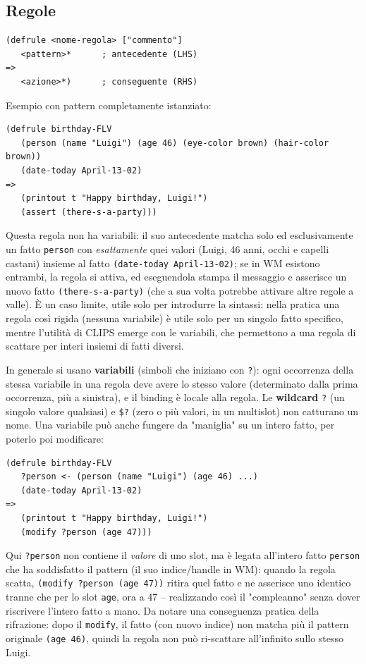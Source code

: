 \documentclass[a4paper,11pt]{article}
\begin{document}
\subsection{Regole}

\begin{lstlisting}
(defrule <nome-regola> ["commento"]
   <pattern>*      ; antecedente (LHS)
=>
   <azione>*)      ; conseguente (RHS)
\end{lstlisting}
Esempio con pattern completamente istanziato:
\begin{lstlisting}
(defrule birthday-FLV
   (person (name "Luigi") (age 46) (eye-color brown) (hair-color brown))
   (date-today April-13-02)
=>
   (printout t "Happy birthday, Luigi!")
   (assert (there-s-a-party)))
\end{lstlisting}
Questa regola non ha variabili: il suo antecedente matcha solo ed esclusivamente un fatto \texttt{person} con \emph{esattamente} quei valori (Luigi, 46 anni, occhi e capelli castani) insieme al fatto \texttt{(date-today April-13-02)}; se in WM esistono entrambi, la regola si attiva, ed eseguendola stampa il messaggio e asserisce un nuovo fatto \texttt{(there-s-a-party)} (che a sua volta potrebbe attivare altre regole a valle). È un caso limite, utile solo per introdurre la sintassi: nella pratica una regola così rigida (nessuna variabile) è utile solo per un singolo fatto specifico, mentre l'utilità di CLIPS emerge con le variabili, che permettono a una regola di scattare per interi insiemi di fatti diversi.

In generale si usano \textbf{variabili} (simboli che iniziano con \texttt{?}): ogni occorrenza della stessa variabile in una regola deve avere lo stesso valore (determinato dalla prima occorrenza, più a sinistra), e il binding è locale alla regola. Le \textbf{wildcard} \texttt{?} (un singolo valore qualsiasi) e \texttt{\$?} (zero o più valori, in un multislot) non catturano un nome. Una variabile può anche fungere da "maniglia" su un intero fatto, per poterlo poi modificare:
\begin{lstlisting}
(defrule birthday-FLV
   ?person <- (person (name "Luigi") (age 46) ...)
   (date-today April-13-02)
=>
   (printout t "Happy birthday, Luigi!")
   (modify ?person (age 47)))
\end{lstlisting}
Qui \texttt{?person} non contiene il \emph{valore} di uno slot, ma è legata all'intero fatto \texttt{person} che ha soddisfatto il pattern (il suo indice/handle in WM): quando la regola scatta, \texttt{(modify ?person (age 47))} ritira quel fatto e ne asserisce uno identico tranne che per lo slot \texttt{age}, ora a 47 -- realizzando così il "compleanno" senza dover riscrivere l'intero fatto a mano. Da notare una conseguenza pratica della rifrazione: dopo il \texttt{modify}, il fatto (con nuovo indice) non matcha più il pattern originale \texttt{(age 46)}, quindi la regola non può ri-scattare all'infinito sullo stesso Luigi.
\end{document}

